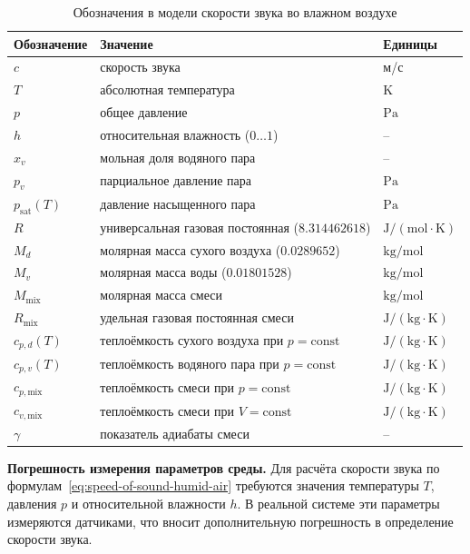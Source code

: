 \begin{table}[!htbp]
  \centering
  \caption{Обозначения в модели скорости звука во влажном воздухе}
  \label{tab:speed-of-sound-notation}
  \small
  \begin{tabular}{lll}
    \toprule
    Обозначение & Значение & Единицы \\
    \midrule
    $c$ & скорость звука & м/с \\
    $T$ & абсолютная температура & $\mathrm{K}$ \\
    $p$ & общее давление & $\mathrm{Pa}$ \\
    $h$ & относительная влажность ($0\ldots 1$) & -- \\
    $x_v$ & мольная доля водяного пара & -- \\
    $p_v$ & парциальное давление пара & $\mathrm{Pa}$ \\
    $p_{\mathrm{sat}}(T)$ & давление насыщенного пара & $\mathrm{Pa}$ \\
    $R$ & универсальная газовая постоянная ($8.314462618$) & $\mathrm{J/(mol\cdot K)}$ \\
    $M_d$ & молярная масса сухого воздуха ($0.0289652$) & $\mathrm{kg/mol}$ \\
    $M_v$ & молярная масса воды ($0.01801528$) & $\mathrm{kg/mol}$ \\
    $M_{\mathrm{mix}}$ & молярная масса смеси & $\mathrm{kg/mol}$ \\
    $R_{\mathrm{mix}}$ & удельная газовая постоянная смеси & $\mathrm{J/(kg\cdot K)}$ \\
    $c_{p,d}(T)$ & теплоёмкость сухого воздуха при $p=\mathrm{const}$ & $\mathrm{J/(kg\cdot K)}$ \\
    $c_{p,v}(T)$ & теплоёмкость водяного пара при $p=\mathrm{const}$ & $\mathrm{J/(kg\cdot K)}$ \\
    $c_{p,\mathrm{mix}}$ & теплоёмкость смеси при $p=\mathrm{const}$ & $\mathrm{J/(kg\cdot K)}$ \\
    $c_{v,\mathrm{mix}}$ & теплоёмкость смеси при $V=\mathrm{const}$ & $\mathrm{J/(kg\cdot K)}$ \\
    $\gamma$ & показатель адиабаты смеси & -- \\
    \bottomrule
  \end{tabular}
\end{table}
\FloatBarrier

\textbf{Погрешность измерения параметров среды.}
Для расчёта скорости звука по формулам~\eqref{eq:speed-of-sound-humid-air} требуются значения температуры $T$, давления $p$ и относительной влажности $h$. В реальной системе эти параметры измеряются датчиками, что вносит дополнительную погрешность в определение скорости звука.

